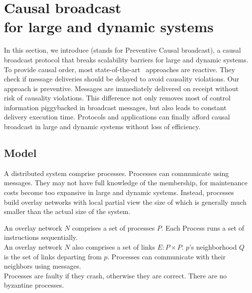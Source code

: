 
\section{Causal broadcast\\for large and dynamic systems}
\label{sec:proposal}

In this section, we introduce \CBROADCAST (stands for Preventive Causal
broadcast), a causal broadcast protocol that breaks scalability barriers for
large and dynamic systems.
To provide causal order, most
state-of-the-art~\cite{almeida2008interval,birman1987reliable,fidge1988timestamps,hadzilacos1993fault,mattern1989virtual,mostefaoui2017probabilistic,singhal1992efficient}
approaches are reactive. They check if message deliveries should be delayed to
avoid causality violations. Our approach is preventive. Messages are immediately
delivered on receipt without risk of causality violations. This difference not
only removes most of control information piggybacked in broadcast messages, but
also leads to constant delivery execution time. Protocols and applications can
finally afford causal broadcast in large and dynamic systems without loss of
efficiency.


\subsection{Model}

A distributed system comprise processes. Processes can communicate using
messages. They may not have full knowledge of the membership, for maintenance
costs become too expansive in large and dynamic systems. Instead, processes
build overlay networks with local partial view the size of which is generally
much smaller than the actual size of the system.

\begin{definition}
  An overlay network $N$ comprises a set of processes $P$. Each Process runs a
  set of instructions sequentially. \\
  An overlay network $N$ also comprises a set of links $E: P \times P$. $p$'s
  neighborhood $Q$ is the set of links departing from $p$. Processes can
  communicate with their neighbors using messages. \\
  Processes are faulty if they crash, otherwise they are correct. %
  There are no byzantine processes.
\end{definition}

